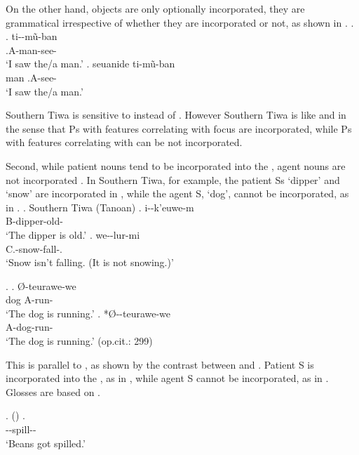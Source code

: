 On the other hand,
 objects are only optionally incorporated,
they are grammatical irrespective of whether they are incorporated or not,
as shown in \Next[a-b].
%
\ex.
 \ag. ti--m\~{u}-ban \\
      .{\sc A}-man-see- \\
      `I saw the/a man.'
 \bg. seuanide ti-m\~{u}-ban \\
      man .{\sc A}-see- \\
      `I saw the/a man.'
      \hfill{\cite[294-295]{allenetal84}}

Southern Tiwa is sensitive to  instead of .
However Southern Tiwa is like  and 
in the sense that
Ps with features correlating with focus are incorporated,
while Ps with features correlating with  can be not incorporated.


Second,
while patient nouns tend to be incorporated into the ,
agent nouns are not incorporated \cite{mithun84,baker88}.
In Southern Tiwa, for example,
the patient Ss `dipper' and `snow' are incorporated in \Next,
while the agent S, `dog', cannot be incorporated, as in \NNext.
\ex. Southern Tiwa (Tanoan)
 \ag. {i--k'euwe-m} \\
	{\sc B}-{dipper}-old- \\
	`The dipper is old.'
 \bg. {we--lur-mi} \\
	{\sc C}.-{snow}-fall-. \\
	`Snow isn't falling. (It is not snowing.)' \hfill{\cite[300]{allenetal84}}
	
\ex.
 \ag. {} {{\O}-teurawe-we} \\
	{dog} {\sc A}-run- \\
	`The dog is running.'
 \bg. *{{\O}--teurawe-we} \\
	{\sc A}-{dog}-run- \\
	`The dog is running.' \hfill{(op.cit.: 299)}

This is parallel to , as shown by the contrast between \Next and \NNext.
Patient S is incorporated into the , as in \Next,
while agent S cannot be incorporated, as in \Next[b].
Glosses are based on .
%

\largerpage[2]
\ex.  ()
 \ag.  \\
	--spill-- \\
	`Beans got spilled.'
	\hfill{\cite[15]{woodbury75}}

